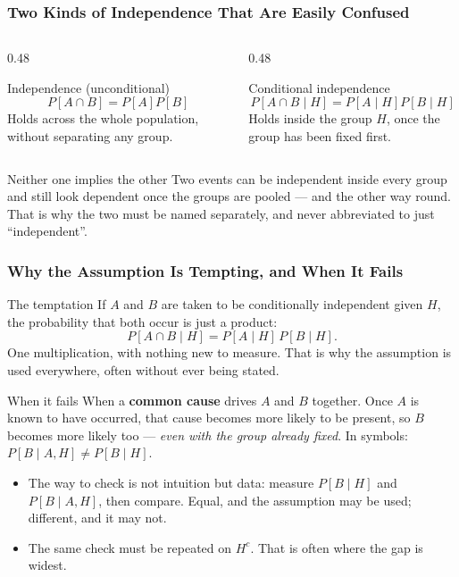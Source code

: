 \begin{frame}[t]
\frametitle{Two Kinds of Independence That Are Easily Confused}
\vspace{1mm}
\footnotesize
\begin{columns}[T]
    \begin{column}{0.48\textwidth}
        \begin{block}{Independence (unconditional)}
            \[ P[A \cap B] = P[A]P[B] \]
            Holds across the whole population, without separating any group.
        \end{block}
    \end{column}
    \begin{column}{0.48\textwidth}
        \begin{block}{Conditional independence}
            \[ P[A \cap B \mid H] = P[A \mid H]P[B \mid H] \]
            Holds inside the group $H$, once the group has been fixed first.
        \end{block}
    \end{column}
\end{columns}
\vspace{2mm}
\begin{alertblock}{Neither one implies the other}
    Two events can be independent inside every group and still look dependent once the groups are pooled --- and the other way round. That is why the two must be named separately, and never abbreviated to just ``independent''.
\end{alertblock}
\end{frame}

\begin{frame}[t]
\frametitle{Why the Assumption Is Tempting, and When It Fails}
\vspace{1mm}
\footnotesize
\begin{block}{The temptation}
    If $A$ and $B$ are taken to be conditionally independent given $H$, the probability that both occur is just a product:
    \[ P[A \cap B \mid H] = P[A \mid H]\,P[B \mid H]. \]
    One multiplication, with nothing new to measure. That is why the assumption is used everywhere, often without ever being stated.
\end{block}
\vspace{-1mm}
\begin{block}{When it fails}
    When a \textbf{common cause} drives $A$ and $B$ together. Once $A$ is known to have occurred, that cause becomes more likely to be present, so $B$ becomes more likely too --- \emph{even with the group already fixed}. In symbols: $P[B \mid A, H] \neq P[B \mid H]$.
\end{block}
\vspace{-1mm}
\begin{itemize}
    \item The way to check is not intuition but data: measure $P[B \mid H]$ and $P[B \mid A, H]$, then compare. Equal, and the assumption may be used; different, and it may not.
    \item The same check must be repeated on $H^c$. That is often where the gap is widest.
\end{itemize}
\end{frame}

